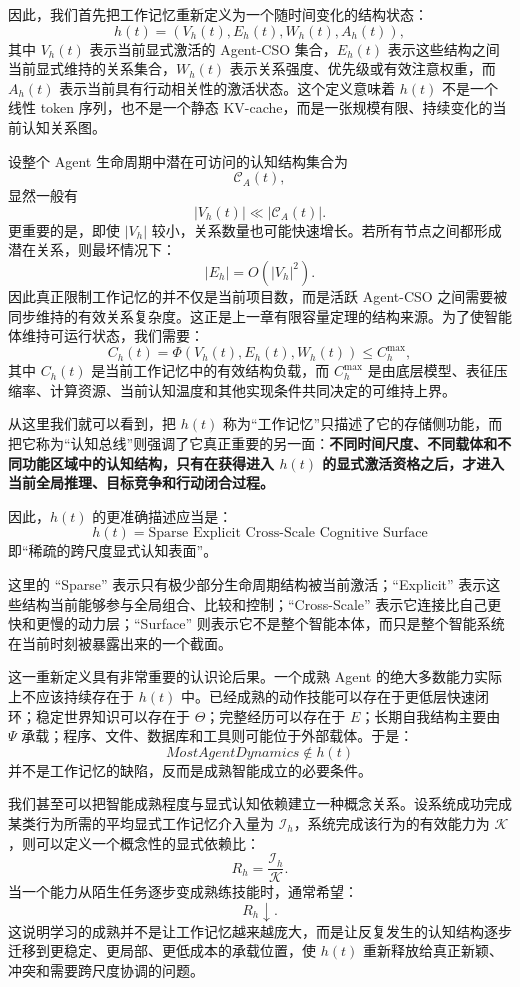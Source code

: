 因此，我们首先把工作记忆重新定义为一个随时间变化的结构状态：
\[
h(t)=
\left(
V_h(t),
E_h(t),
W_h(t),
A_h(t)
\right),
\]
其中 $V_h(t)$ 表示当前显式激活的 Agent-CSO 集合，$E_h(t)$ 表示这些结构之间当前显式维持的关系集合，$W_h(t)$ 表示关系强度、优先级或有效注意权重，而 $A_h(t)$ 表示当前具有行动相关性的激活状态。这个定义意味着 $h(t)$ 不是一个线性 token 序列，也不是一个静态 KV-cache，而是一张规模有限、持续变化的当前认知关系图。

设整个 Agent 生命周期中潜在可访问的认知结构集合为
\[
\mathcal C_A(t),
\]
显然一般有
\[
|V_h(t)|\ll |\mathcal C_A(t)|.
\]
更重要的是，即使 $|V_h|$ 较小，关系数量也可能快速增长。若所有节点之间都形成潜在关系，则最坏情况下：
\[
|E_h|
=
O(|V_h|^2).
\]
因此真正限制工作记忆的并不仅是当前项目数，而是活跃 Agent-CSO 之间需要被同步维持的有效关系复杂度。这正是上一章有限容量定理的结构来源。为了使智能体维持可运行状态，我们需要：
\[
C_h(t)
=
\Phi
\left(
V_h(t),
E_h(t),
W_h(t)
\right)
\leq C_h^{\max},
\]
其中 $C_h(t)$ 是当前工作记忆中的有效结构负载，而 $C_h^{\max}$ 是由底层模型、表征压缩率、计算资源、当前认知温度和其他实现条件共同决定的可维持上界。

从这里我们就可以看到，把 $h(t)$ 称为“工作记忆”只描述了它的存储侧功能，而把它称为“认知总线”则强调了它真正重要的另一面：\textbf{不同时间尺度、不同载体和不同功能区域中的认知结构，只有在获得进入 $h(t)$ 的显式激活资格之后，才进入当前全局推理、目标竞争和行动闭合过程。}

因此，$h(t)$ 的更准确描述应当是：
\[
\boxed{
h(t)
=
\text{Sparse Explicit Cross-Scale Cognitive Surface}
}
\]
即“稀疏的跨尺度显式认知表面”。

这里的 ``Sparse'' 表示只有极少部分生命周期结构被当前激活；``Explicit'' 表示这些结构当前能够参与全局组合、比较和控制；``Cross-Scale'' 表示它连接比自己更快和更慢的动力层；``Surface'' 则表示它不是整个智能本体，而只是整个智能系统在当前时刻被暴露出来的一个截面。

这一重新定义具有非常重要的认识论后果。一个成熟 Agent 的绝大多数能力实际上不应该持续存在于 $h(t)$ 中。已经成熟的动作技能可以存在于更低层快速闭环；稳定世界知识可以存在于 $\Theta$；完整经历可以存在于 $E$；长期自我结构主要由 $\Psi$ 承载；程序、文件、数据库和工具则可能位于外部载体。于是：
\[
\boxed{
MostAgentDynamics\notin h(t)
}
\]
并不是工作记忆的缺陷，反而是成熟智能成立的必要条件。

我们甚至可以把智能成熟程度与显式认知依赖建立一种概念关系。设系统成功完成某类行为所需的平均显式工作记忆介入量为 $\mathcal I_h$，系统完成该行为的有效能力为 $\mathcal K$，则可以定义一个概念性的显式依赖比：
\[
R_h
=
\frac{\mathcal I_h}{\mathcal K}.
\]
当一个能力从陌生任务逐步变成熟练技能时，通常希望：
\[
R_h\downarrow.
\]
这说明学习的成熟并不是让工作记忆越来越庞大，而是让反复发生的认知结构逐步迁移到更稳定、更局部、更低成本的承载位置，使 $h(t)$ 重新释放给真正新颖、冲突和需要跨尺度协调的问题。

